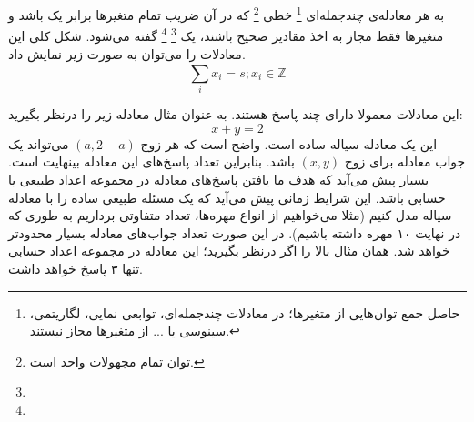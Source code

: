 
\begin{definition}
    \p
    به هر معادله‌ی چندجمله‌ای
    \footnote{حاصل جمع توان‌هایی از متغیر‌ها؛ در معادلات چندجمله‌ای،
    توابعی نمایی، لگاریتمی، سینوسی یا ... از متغیر‌ها مجاز نیستند.}
    خطی
    \footnote{توان تمام مجهولات واحد است.}
    که در آن ضریب تمام متغیر‌ها برابر یک باشد
    و متغیر‌ها فقط مجاز به اخذ مقادیر صحیح باشند،
    یک
    \footnote{}
    \footnote{}
    گفته می‌شود.
    شکل کلی این معادلات را می‌توان به صورت زیر نمایش داد.
    $$\sum\limits_{i}^{} {x_i} = s ; x_i \in \mathbb{Z}$$
\end{definition}

\p
این معادلات معمولا دارای چند پاسخ هستند.
به عنوان مثال معادله زیر را درنظر بگیرید:
$$x + y = 2$$
این یک معادله سیاله ساده است.
واضح است که هر زوج
$(a, 2-a)$
می‌تواند یک جواب معادله برای زوج
$(x,y)$
باشد. بنابراین تعداد پاسخ‌های این معادله بینهایت است.
بسیار پیش می‌آید که هدف ما یافتن پاسخ‌های معادله در مجموعه اعداد طبیعی یا حسابی باشد.
این شرایط زمانی پیش می‌آید که یک مسئله طبیعی ساده را با معادله سیاله مدل کنیم
(مثلا می‌خواهیم از انواع مهره‌ها، تعداد متفاوتی برداریم به طوری که در نهایت ۱۰ مهره داشته باشیم).
در این صورت تعداد جواب‌های معادله بسیار محدود‌تر خواهد شد.
همان مثال بالا را اگر درنظر بگیرید؛ این معادله در مجموعه اعداد حسابی تنها ۳ پاسخ خواهد داشت.





